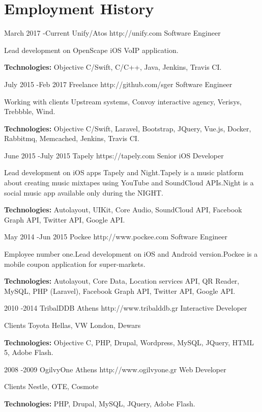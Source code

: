 \documentclass[10pt]{article}
\begin{document}
\section{Employment History}

\job
{March 2017 -}{Current}
{Unify/Atos}
{http://unify.com}
{Software Engineer}
{Lead development on OpenScape iOS VoIP application.
\\
\rule{0mm}{5mm}\textbf{Technologies:} Objective C/Swift, C/C++, Java, Jenkins, Travis CI.}

\job
{July 2015 -}{Feb 2017}
{Freelance}
{http://github.com/sger}
{Software Engineer}
{Working with clients Upstream systems, Convoy interactive agency, Verisys, Trebbble, Wind.
\\
\rule{0mm}{5mm}\textbf{Technologies:} Objective C/Swift, Laravel, Bootstrap, JQuery, Vue.js, Docker, Rabbitmq, Memcached, Jenkins, Travis CI.}


\job
{June 2015 -}{July 2015}
{Tapely}
{https://tapely.com}
{Senior iOS Developer}
{Lead development on iOS apps Tapely and Night.Tapely is a music platform about creating music mixtapes using YouTube and SoundCloud APIs.Night is a social music app available only during the NIGHT.
\\
\rule{0mm}{5mm}\textbf{Technologies:} Autolayout, UIKit, Core Audio, SoundCloud API, Facebook Graph API, Twitter API, Google API.}



\job
{May 2014 -}{Jun 2015}
{Pockee}
{http://www.pockee.com}
{Software Engineer}
{Employee number one.Lead development on iOS and Android version.Pockee is a mobile coupon application for super-markets.
\\
\rule{0mm}{5mm}\textbf{Technologies:} Autolayout, Core Data, Location services API, QR Reader, MySQL, PHP (Laravel), Facebook Graph API, Twitter API, Google API.}


\job
{2010 -}{2014}
{TribalDDB Athens}
{http://www.tribalddb.gr}
{Interactive Developer}
{Clients Toyota Hellas, VW London, Dewars
\\
\rule{0mm}{5mm}\textbf{Technologies:} Objective C, PHP, Drupal, Wordpress, MySQL, JQuery, HTML 5, Adobe Flash.}


\job
{2008 -}{2009}
{OgilvyOne Athens}
{http://www.ogilvyone.gr}
{Web Developer}
{Clients Nestle, OTE, Cosmote
\\
\rule{0mm}{5mm}\textbf{Technologies:} PHP, Drupal, MySQL, JQuery, Adobe Flash.}
\end{document}
